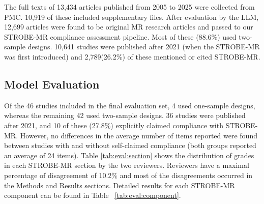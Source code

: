 


% 

% 




The full texts of 13,434 articles published from 2005 to 2025 were collected from PMC. 10,919 of these included supplementary files. After evaluation by the LLM, 12,699 articles were found to be original MR research articles and passed to our STROBE-MR compliance assessment pipeline. Most of these (88.6\%) used two-sample designs. 10,641 studies were published after 2021 (when the STROBE-MR was first introduced) and 2,789(26.2\%) of these mentioned or cited STROBE-MR.
% 

\subsection{Model Evaluation}

Of the 46 studies included in the final evaluation set, 4 used one-sample designs, whereas the remaining 42 used two-sample designs. 36 studies were published after 2021, and 10 of these (27.8\%) explicitly claimed compliance with STROBE-MR. However, no differences in the average number of items reported were found between studies with and without self-claimed compliance (both groups reported an average of 24 items). Table \ref{tab:eval:section} shows the distribution of grades in each STROBE-MR section by the two reviewers. Reviewers have a maximal percentage of disagreement of 10.2\% and most of the disagreements occurred in the Methods and Results sections. Detailed results for each STROBE-MR component can be found in Table ~\ref{tab:eval:component}.

